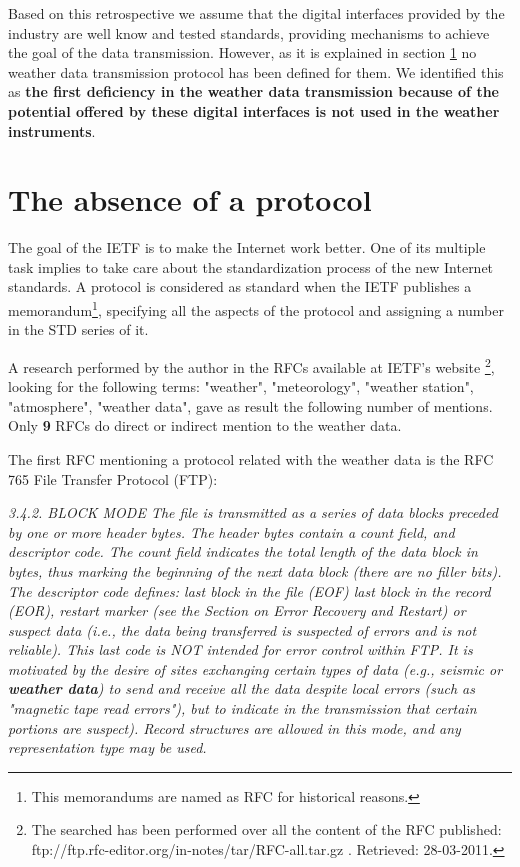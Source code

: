 Based on this retrospective we assume that the digital interfaces provided by the industry are well know and tested standards, providing mechanisms to achieve the goal of the data transmission. However, as it is explained in section \ref{4.2} no weather data transmission protocol has been defined for them. We identified this as \textbf{the first deficiency in the weather data transmission because of the potential offered by these digital interfaces is not used in the weather instruments}. 

\section{The absence of a protocol}\label{4.2}

The goal of the \gls{IETF}\cite{IETF} is to make the Internet work better. One of its multiple task implies to take care about the standardization process of the new Internet standards. A protocol is considered as standard when the IETF publishes a memorandum\footnote{This memorandums are named as \gls{RFC} for historical reasons.}, specifying all the aspects of the protocol and assigning a number in the STD series of it\cite{rfc2026}.

A research performed by the author in the \gls{RFC}s available at \gls{IETF}'s website \cite{IETF}\footnote{The searched has been performed over all the content of the RFC published: ftp://ftp.rfc-editor.org/in-notes/tar/RFC-all.tar.gz . Retrieved: 28-03-2011.}, looking for the following terms: "weather", "meteorology", "weather station", "atmosphere", "weather data", gave as result the following number of mentions. Only \textbf{9} \gls{RFC}s do direct or indirect mention to the weather data. 

The first \gls{RFC} mentioning a protocol related with the weather data is the RFC 765 \cite{rfc765} File Transfer Protocol (FTP): 

\emph{3.4.2.  BLOCK MODE
         The file is transmitted as a series of data blocks preceded by
         one or more header bytes.  The header bytes contain a count
         field, and descriptor code.  The count field indicates the
         total length of the data block in bytes, thus marking the
         beginning of the next data block (there are no filler bits).
         The descriptor code defines:  last block in the file (EOF) last
         block in the record (EOR), restart marker (see the Section on
         Error Recovery and Restart) or suspect data (i.e., the data
         being transferred is suspected of errors and is not reliable).
         This last code is NOT intended for error control within FTP.
         It is motivated by the desire of sites exchanging certain types
         of data (e.g., seismic or \textbf{weather data}) to send and receive all
         the data despite local errors (such as "magnetic tape read
         errors"), but to indicate in the transmission that certain
         portions are suspect).  Record structures are allowed in this
         mode, and any representation type may be used.}

